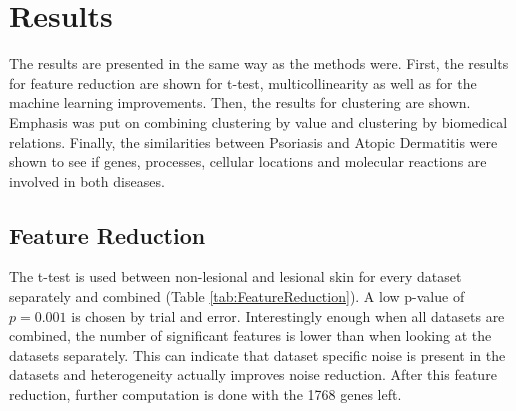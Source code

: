 \documentclass[10pt,a4paper]{article}
\begin{document}
	\section{Results}
	\label{sec:Results}
	
	The results are presented in the same way as the methods were. First, the results for feature reduction are shown for t-test, multicollinearity as well as for the machine learning improvements. Then, the results for clustering are shown. Emphasis was put on combining clustering by value and clustering by biomedical relations. Finally, the similarities between Psoriasis and Atopic Dermatitis were shown to see if genes, processes, cellular locations and molecular reactions are involved in both diseases. 
	
	
	\subsection{Feature Reduction}
	\label{subsec:ResultsFeatureResuction}
	
	The t-test is used between non-lesional and lesional skin for every dataset separately and combined (Table \ref{tab:FeatureReduction}). A low p-value of $p=0.001$ is chosen by trial and error. Interestingly enough when all datasets are combined, the number of significant features is lower than when looking at the datasets separately. This can indicate that dataset specific noise is present in the datasets and heterogeneity actually improves noise reduction. After this feature reduction, further computation is done with the 1768 genes left.
	
\end{document}

